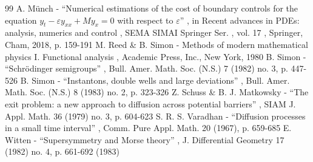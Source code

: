 \documentclass[11pt]{article}
\numberwithin{equation}{section}
\begin{document}
\begin{thebibliography}{99}
 A. Münch - “Numerical estimations of the cost of boundary controls for the equation $y_t-\varepsilon y_{xx}+My_x=0$ with respect to $\varepsilon $” , in Recent advances in PDEs: analysis, numerics and control , SEMA SIMAI Springer Ser. , vol. 17 , Springer, Cham, 2018, p. 159-191
 M. Reed \& B. Simon - Methods of modern mathematical physics I. Functional analysis , Academic Press, Inc., New York, 1980
 B. Simon - “Schrödinger semigroups” , Bull. Amer. Math. Soc. (N.S.) 7 (1982) no. 3, p. 447-526
 B. Simon - “Instantons, double wells and large deviations” , Bull. Amer. Math. Soc. (N.S.) 8 (1983) no. 2, p. 323-326
 Z. Schuss \& B. J. Matkowsky - “The exit problem: a new approach to diffusion across potential barriers” , SIAM J. Appl. Math. 36 (1979) no. 3, p. 604-623
 S. R. S. Varadhan - “Diffusion processes in a small time interval” , Comm. Pure Appl. Math. 20 (1967), p. 659-685
 E. Witten - “Supersymmetry and Morse theory” , J. Differential Geometry 17 (1982) no. 4, p. 661-692 (1983)
\end{thebibliography}
\end{document}
